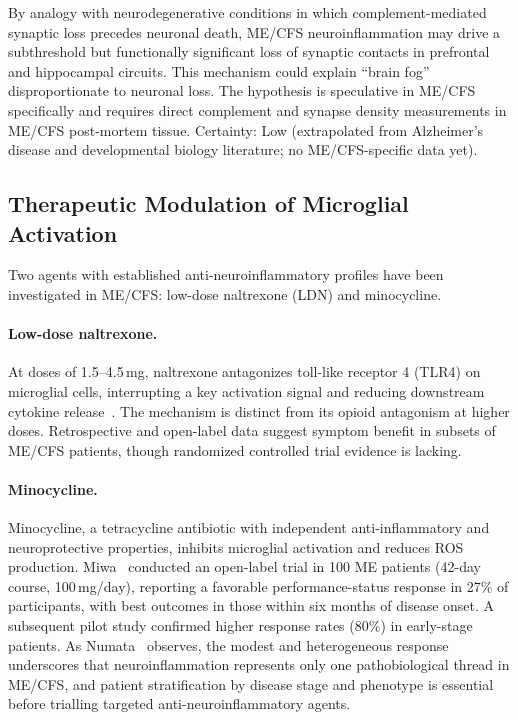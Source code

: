 \begin{speculation}
\label{spec:synaptic-pruning-mecfs}
By analogy with neurodegenerative conditions in which complement-mediated synaptic loss precedes neuronal death, ME/CFS neuroinflammation may drive a subthreshold but functionally significant loss of synaptic contacts in prefrontal and hippocampal circuits. This mechanism could explain ``brain fog'' disproportionate to neuronal loss. The hypothesis is speculative in ME/CFS specifically and requires direct complement and synapse density measurements in ME/CFS post-mortem tissue. Certainty: Low (extrapolated from Alzheimer's disease and developmental biology literature; no ME/CFS-specific data yet).
\end{speculation}

\subsection{Therapeutic Modulation of Microglial Activation}

Two agents with established anti-neuroinflammatory profiles have been investigated in ME/CFS: low-dose naltrexone (LDN) and minocycline.

\paragraph{Low-dose naltrexone.} At doses of 1.5--4.5\,mg, naltrexone antagonizes toll-like receptor 4 (TLR4) on microglial cells, interrupting a key activation signal and reducing downstream cytokine release~\cite{Younger2013, Bolton2020LDN, Polo2019LDN}. The mechanism is distinct from its opioid antagonism at higher doses. Retrospective and open-label data suggest symptom benefit in subsets of ME/CFS patients, though randomized controlled trial evidence is lacking.

\paragraph{Minocycline.} Minocycline, a tetracycline antibiotic with independent anti-inflammatory and neuroprotective properties, inhibits microglial activation and reduces ROS production. Miwa~\cite{Miwa2021minocycline} conducted an open-label trial in 100 ME patients (42-day course, 100\,mg/day), reporting a favorable performance-status response in 27\% of participants, with best outcomes in those within six months of disease onset. A subsequent pilot study confirmed higher response rates (80\%) in early-stage patients. As Numata~\cite{Numata2021minocycline} observes, the modest and heterogeneous response underscores that neuroinflammation represents only one pathobiological thread in ME/CFS, and patient stratification by disease stage and phenotype is essential before trialling targeted anti-neuroinflammatory agents.

